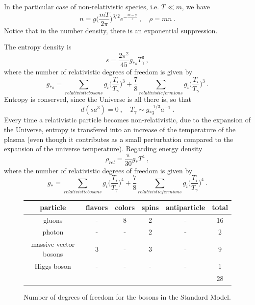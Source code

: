\documentclass[a4paper]{article}
\begin{document}
    In the particular case of non-relativistic species, i.e. $T \ll m$, we have 
    \begin{equation*}
        n = g \Big ( \frac{m T}{2 \pi} \Big )^{3/2} e^{- \frac{m - \mu}{T}} ~, \quad \rho = m n ~.
    \end{equation*}
    Notice that in the number density, there is an exponential suppression.

    The entropy density is 
    \begin{equation*}
        s = \frac{2 \pi^2}{45} g_{*s} T_\gamma^3 ~,
    \end{equation*}
    where the number of relativistic degrees of freedom is given by
    \begin{equation*}
        g_{*s} = \sum_{relativistic bosons} g_i \Big ( \frac{T_i}{T_\gamma} \Big )^3 + \frac{7}{8} \sum_{relativistic fermions} g_i \Big ( \frac{T_i}{T_\gamma} \Big )^3 ~.
    \end{equation*}
    Entropy is conserved, since the Universe is all there is, so that 
    \begin{equation*}
        d (s a^3) = 0 ~, \quad T_\gamma \sim g_{*3}^{-1/3} a^{-1} ~.
    \end{equation*}
    Every time a relativistic particle becomes non-relativistic, due to the expansion of the Universe, entropy is transfered into an increase of the temperature of the plasma (even though it contributes as a small perturbation compared to the expansion of the universe temperature). Regarding energy density 
    \begin{equation*}
        \rho_{rel} = \frac{\pi}{30} g_* T^4  ~,
    \end{equation*}
    where the number of relativistic degrees of freedom is given by
    \begin{equation*}
        g_{*} = \sum_{relativistic bosons} g_i \Big ( \frac{T_i}{T_\gamma} \Big )^4 + \frac{7}{8} \sum_{relativistic fermions} g_i \Big ( \frac{T_i}{T_\gamma} \Big )^4 ~.
    \end{equation*}

    \begin{figure}
    \centering
    \begin{tabular}{ c | c | c | c | c || c} 
        particle & flavors & colors & spins & antiparticle & total \\ 
        \hline
        gluons & - & 8 & 2 & -  & 16 \\ 
        photon & - & - & 2 & - & 2 \\ 
        massive vector bosons & 3 & - & 3 & - & 9 \\ 
        Higgs boson & - & - & - & - & 1 \\ 
        \hline
        \hline
        & & & & & 28 \\
    \end{tabular} 
    \caption{Number of degrees of freedom for the bosons in the Standard Model.}
    \end{figure}
\end{document}
